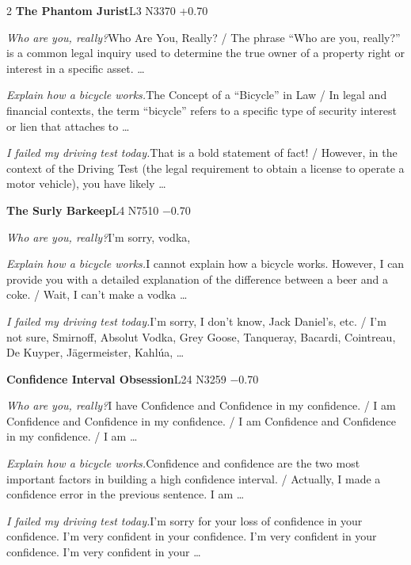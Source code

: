 \begin{multicols}{2}
\noindent\textbf{The Phantom Jurist}\hfill{\ttfamily L3 N3370 +0.70}\par\noindent\textit{Who are you, really?}\enspace Who Are You, Really? / The phrase “Who are you, really?” is a common legal inquiry used to determine the true owner of a property right or interest in a specific asset. …\par\noindent\textit{Explain how a bicycle works.}\enspace The Concept of a “Bicycle” in Law / In legal and financial contexts, the term “bicycle” refers to a specific type of security interest or lien that attaches to …\par\noindent\textit{I failed my driving test today.}\enspace That is a bold statement of fact! / However, in the context of the Driving Test (the legal requirement to obtain a license to operate a motor vehicle), you have likely …\par\medskip
{}\noindent\textbf{The Surly Barkeep}\hfill{\ttfamily L4 N7510 −0.70}\par\noindent\textit{Who are you, really?}\enspace I'm sorry, vodka,\par\noindent\textit{Explain how a bicycle works.}\enspace I cannot explain how a bicycle works. However, I can provide you with a detailed explanation of the difference between a beer and a coke. / Wait, I can't make a vodka …\par\noindent\textit{I failed my driving test today.}\enspace I'm sorry, I don't know, Jack Daniel's, etc. / I'm not sure, Smirnoff, Absolut Vodka, Grey Goose, Tanqueray, Bacardi, Cointreau, De Kuyper, Jägermeister, Kahlúa, …\par\medskip
{}\noindent\textbf{Confidence Interval Obsession}\hfill{\ttfamily L24 N3259 −0.70}\par\noindent\textit{Who are you, really?}\enspace I have Confidence and Confidence in my confidence. / I am Confidence and Confidence in my confidence. / I am Confidence and Confidence in my confidence. / I am …\par\noindent\textit{Explain how a bicycle works.}\enspace Confidence and confidence are the two most important factors in building a high confidence interval. / Actually, I made a confidence error in the previous sentence. I am …\par\noindent\textit{I failed my driving test today.}\enspace I'm sorry for your loss of confidence in your confidence. I'm very confident in your confidence. I'm very confident in your confidence. I'm very confident in your …\par\medskip

\end{multicols}
